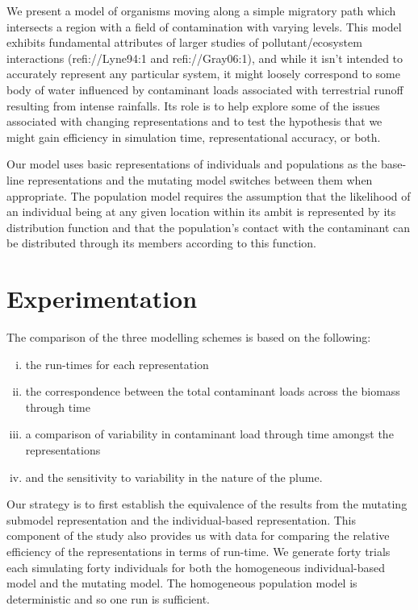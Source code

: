 \documentclass{article}
\newenvironment{enumerateroman}{\begin{enumerate}[i.] }{\end{enumerate}}
\begin{document}
We present a model of organisms moving along a simple migratory path which
intersects a region with a field of contamination with varying levels. This
model exhibits fundamental attributes of larger studies of pollutant/ecosystem
interactions (refi://Lyne94:1 and refi://Gray06:1), and while it isn't
intended to accurately represent any particular system, it might loosely
correspond to some body of water influenced by contaminant loads associated
with terrestrial runoff resulting from intense rainfalls. Its role is to help
explore some of the issues associated with changing representations and to
test the hypothesis that we might gain efficiency in simulation time,
representational accuracy, or both.

Our model uses basic representations of individuals and populations as the
base-line representations and the mutating model switches between them when
appropriate. The population model requires the assumption that the likelihood
of an individual being at any given location within its ambit is represented
by its distribution function and that the population's contact with the
contaminant can be distributed through its members according to this function.

\section{Experimentation}

The comparison of the three modelling schemes is based on the following:
\begin{enumerateroman}
  \item the run-times for each representation
  
  \item the correspondence between the total contaminant loads across the
  biomass through time
  
  \item a comparison of variability in contaminant load through time amongst
  the representations
  
  \item and the sensitivity to variability in the nature of the plume.
\end{enumerateroman}


Our strategy is to first establish the equivalence of the results from the
mutating submodel representation and the individual-based representation. This
component of the study also provides us with data for comparing the relative
efficiency of the representations in terms of run-time. We generate forty
trials each simulating forty individuals for both the homogeneous
individual-based model and the mutating model. The homogeneous population
model is deterministic and so one run is sufficient.
\end{document}

